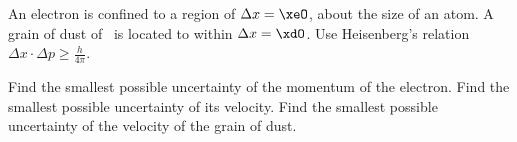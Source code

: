 An electron is confined to a region of $\Delta x = \xeO$, about the size of an atom. A grain of dust of \mdO\ is located to within $\Delta x = \xdO$. Use Heisenberg's relation $\Delta x\cdot\Delta p \geq \frac{h}{4\pi}$.

\begin{abcliste}
\abc Find the smallest possible uncertainty of the momentum of the electron.
\abc Find the smallest possible uncertainty of its velocity.
\abc Find the smallest possible uncertainty of the velocity of the grain of dust.
\end{abcliste}
